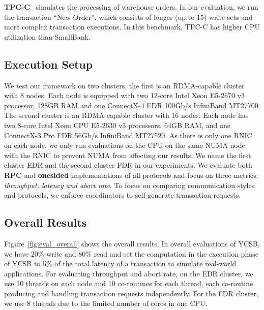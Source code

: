 \textbf{TPC-C}~\cite{TPC-C} simulates the processing of warehouse orders. In our evaluation, we run the transaction ``New-Order'', which consists of longer (up to 15) write sets and more complex transaction executions. In this benchmark, TPC-C has higher 
CPU utilization than SmallBank.

\vspace{-2mm}
\subsection{Execution Setup}
\vspace{-2mm}

We test our framework on two clusters, the first is an RDMA-capable cluster with 8 nodes. Each node is equipped with two 12-core Intel Xeon E5-2670 v3 processor, 128GB RAM and one ConnectX-4 EDR 100Gb/s InfiniBand MT27700. The second cluster is an RDMA-capable cluster with 16 nodes. Each node has two 8-core Intel Xeon CPU E5-2630 v3 processors, 64GB RAM, and one ConnectX-3 Pro FDR 56Gb/s InfiniBand MT27520. As there is only one RNIC on each node, we only run evaluations on the CPU on the same NUMA node with the RNIC to prevent NUMA from affecting our results. We name the first cluster EDR and the second cluster FDR in our experiments. We evaluate both \textbf{RPC} and \textbf{onesided} implementations of all \projectname protocols and focus on three metrics: {\em throughput, latency and abort rate}. To focus on comparing communication styles and protocols, we enforce coordinators to self-generate transaction requests.

\vspace{-2mm}
\subsection{Overall Results}
\vspace{-2mm}


Figure~\ref{fig:eval_overall} shows the overall results. In overall evaluations of YCSB, we have 20\% write and 80\% read and set the computation in the execution phase of YCSB to 5\% of the total latency of a transaction to simulate real-world applications. For evaluating throughput and abort rate, on the EDR cluster, we use 10 threads on each node and 10 co-routines for each thread, each co-routine producing and handling transaction requests independently. For the FDR cluster, we use 8 threads due to the limited number of cores in one CPU. %

